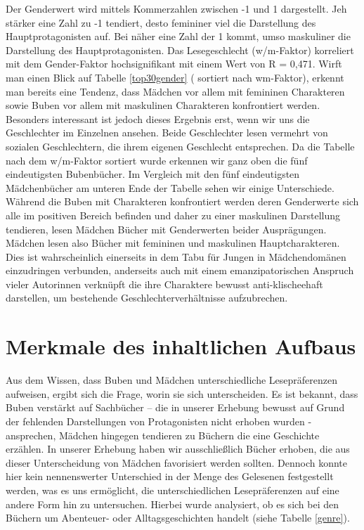 Der Genderwert wird mittels Kommerzahlen zwischen -1 und 1 dargestellt.
Jeh stärker eine Zahl zu -1 tendiert, desto femininer viel die
Darstellung des Hauptprotagonisten auf. Bei näher eine Zahl der 1 kommt,
umso maskuliner die Darstellung des Hauptprotagonisten. Das
Lesegeschlecht (w/m-Faktor) korreliert mit dem Gender-Faktor
hochsignifikant mit einem Wert von R = 0,471. Wirft man einen Blick auf
Tabelle \ref{top30gender} ( sortiert nach wm-Faktor), erkennt man
bereits eine Tendenz, dass Mädchen vor allem mit femininen Charakteren
sowie Buben vor allem mit maskulinen Charakteren konfrontiert werden.
Besonders interessant ist jedoch dieses Ergebnis erst, wenn wir uns die
Geschlechter im Einzelnen ansehen. Beide Geschlechter lesen vermehrt von
sozialen Geschlechtern, die ihrem eigenen Geschlecht entsprechen. Da die
Tabelle nach dem w/m-Faktor sortiert wurde erkennen wir ganz oben die
fünf eindeutigsten Bubenbücher. Im Vergleich mit den fünf eindeutigsten
Mädchenbücher am unteren Ende der Tabelle sehen wir einige Unterschiede.
Während die Buben mit Charakteren konfrontiert werden deren Genderwerte
sich alle im positiven Bereich befinden und daher zu einer maskulinen
Darstellung tendieren, lesen Mädchen Bücher mit Genderwerten beider
Ausprägungen. Mädchen lesen also Bücher mit femininen und maskulinen
Hauptcharakteren. Dies ist wahrscheinlich einerseits in dem Tabu für
Jungen in Mädchendomänen einzudringen verbunden, anderseits auch mit
einem emanzipatorischen Anspruch vieler Autorinnen verknüpft die ihre
Charaktere bewusst anti-klischeehaft darstellen, um bestehende
Geschlechterverhältnisse aufzubrechen.



\section{Merkmale des inhaltlichen Aufbaus}

Aus dem Wissen, dass Buben und Mädchen unterschiedliche Lesepräferenzen
aufweisen, ergibt sich die Frage, worin sie sich unterscheiden. Es ist
bekannt, dass Buben verstärkt auf Sachbücher -- die in unserer Erhebung
bewusst auf Grund der fehlenden Darstellungen von Protagonisten nicht
erhoben wurden - ansprechen, Mädchen hingegen tendieren zu Büchern die
eine Geschichte erzählen. In unserer Erhebung haben wir ausschließlich
Bücher erhoben, die aus dieser Unterscheidung von Mädchen favorisiert
werden sollten. Dennoch konnte hier kein nennenswerter Unterschied in
der Menge des Gelesenen festgestellt werden, was es uns ermöglicht, die
unterschiedlichen Lesepräferenzen auf eine andere Form hin zu
untersuchen. Hierbei wurde analysiert, ob es sich bei den Büchern um
Abenteuer- oder Alltagsgeschichten handelt (siehe Tabelle \ref{genre}).

